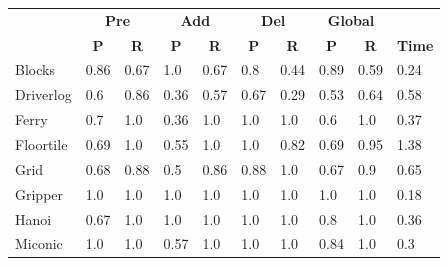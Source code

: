 \begin{table}[hbt!]
		\begin{center}
                  \begin{footnotesize}			
			\begin{tabular}{l|l|l|l|l|l|l||l|l||l|}
				& \multicolumn{2}{|c|}{\bf Pre} & \multicolumn{2}{|c|}{\bf Add} & \multicolumn{2}{|c||}{\bf Del} & \multicolumn{2}{|c|}{\bf Global} & \\ \cline{2-9}			
				& \multicolumn{1}{|c|}{\bf P} & \multicolumn{1}{|c|}{\bf R} & \multicolumn{1}{|c|}{\bf P} & \multicolumn{1}{|c|}{\bf R} & \multicolumn{1}{|c|}{\bf P} & \multicolumn{1}{|c||}{\bf R} &  \multicolumn{1}{|c|}{\bf P} & \multicolumn{1}{|c|}{\bf R} & {\bf Time} \\
				\hline
				Blocks & 0.86 & 0.67 & 1.0 & 0.67 & 0.8 & 0.44 & 0.89 & 0.59& 0.24 \\ %
				Driverlog & 0.6 & 0.86 & 0.36 & 0.57 & 0.67 & 0.29 & 0.53 & 0.64& 0.58 \\ %
				Ferry & 0.7 & 1.0 & 0.36 & 1.0 & 1.0 & 1.0 & 0.6 & 1.0& 0.37 \\ %
				Floortile & 0.69 & 1.0 & 0.55 & 1.0 & 1.0 & 0.82 & 0.69 & 0.95& 1.38 \\ %
				Grid & 0.68 & 0.88 & 0.5 & 0.86 & 0.88 & 1.0 & 0.67 & 0.9& 0.65 \\ %
				Gripper & 1.0 & 1.0 & 1.0 & 1.0 & 1.0 & 1.0 & 1.0 & 1.0& 0.18 \\ %
				Hanoi & 0.67 & 1.0 & 1.0 & 1.0 & 1.0 & 1.0 & 0.8 & 1.0& 0.36 \\ %
				Miconic & 1.0 & 1.0 & 0.57 & 1.0 & 1.0 & 1.0 & 0.84 & 1.0& 0.3 \\ %

\end{tabular}
\end{footnotesize}
\end{center}
\end{table}
